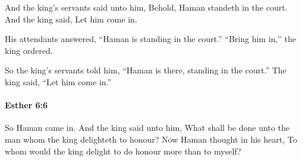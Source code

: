 			\begin{versebox}
					\item[BHS] 
					\item[LXX] 
					\item[ASV] And the king's servants said unto him, Behold, Haman standeth in the court. And the king said, Let him come in.
					\item[NIV] His attendants answered, “Haman is standing in the court.” “Bring him in,” the king ordered.
					\item[NRSV] So the king’s servants told him, “Haman is there, standing in the court.” The king said, “Let him come in.”
			\end{versebox}

		\paragraph{Esther 6:6} %
			\label{ESTHER-6-6}

			So Haman came in. And the king said unto him, What shall be done unto the man whom the king delighteth to honour? Now Haman thought in his heart, To whom would the king delight to do honour more than to myself?

